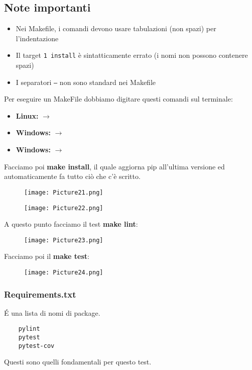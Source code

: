 \documentclass[a4paper,12pt]{article}
\begin{document}
\subsection*{Note importanti}
\begin{itemize}
    \item Nei Makefile, i comandi devono usare tabulazioni (non spazi) per l'indentazione
    \item Il target \texttt{1 install} è sintatticamente errato (i nomi non possono contenere spazi)
    \item I separatori \texttt{---} non sono standard nei Makefile
\end{itemize}

Per eseguire un MakeFile dobbiamo digitare questi comandi sul terminale:
\begin{itemize}
    \item \textbf{Linux: } $\rightarrow $ 
    \item \textbf{Windows: } $\rightarrow $ 
    \item \textbf{Windows: } $\rightarrow $ 
\end{itemize}
Facciamo poi \textbf{make install}, il quale aggiorna pip all'ultima versione ed automaticamente fa tutto ciò che c'è scritto.
\begin{figure}[H]
  \centering
  \texttt{[image: Picture21.png]}
  \label{etichetta21}
\end{figure}
\begin{figure}[H]
  \centering
  \texttt{[image: Picture22.png]}
  \label{etichetta22}
\end{figure}
A questo punto facciamo il test \textbf{make lint}: 
\begin{figure}[H]
  \centering
  \texttt{[image: Picture23.png]}
  \label{etichetta23}
\end{figure}
Facciamo poi il \textbf{make test}: 
\begin{figure}[H]
  \centering
  \texttt{[image: Picture24.png]}
  \label{etichetta24}
\end{figure}

\subsubsection{Requirements.txt}
\'{E} una lista di nomi di package.
\begin{lstlisting}
    pylint
    pytest
    pytest-cov
\end{lstlisting}
Questi sono quelli fondamentali per questo test.
\end{document}
